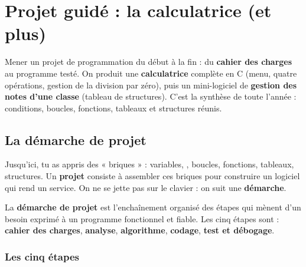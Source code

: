 \chapter{Projet guidé : la calculatrice (et plus)}

\begin{synthese}[Au programme]
Mener un projet de programmation du début à la fin : du \textbf{cahier des charges}
au programme testé. On produit une \textbf{calculatrice} complète en C (menu, quatre
opérations, gestion de la division par zéro), puis un mini-logiciel de
\textbf{gestion des notes d'une classe} (tableau de structures). C'est la synthèse
de toute l'année : conditions, boucles, fonctions, tableaux et structures réunis.
\end{synthese}

\section{La démarche de projet}

Jusqu'ici, tu as appris des « briques » : variables, , boucles, fonctions,
tableaux, structures. Un \textbf{projet} consiste à assembler ces briques pour
construire un logiciel qui rend un service. On ne se jette pas sur le clavier : on
suit une \textbf{démarche}.

\begin{definition}
La \textbf{démarche de projet} est l'enchaînement organisé des étapes qui mènent
d'un besoin exprimé à un programme fonctionnel et fiable. Les cinq étapes sont :
\textbf{cahier des charges}, \textbf{analyse}, \textbf{algorithme}, \textbf{codage},
\textbf{test et débogage}.
\end{definition}

\subsection{Les cinq étapes}

